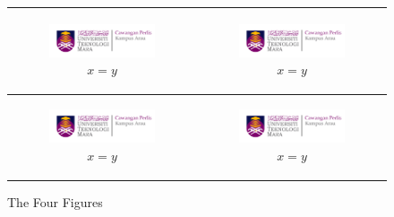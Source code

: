 \begin{figure}[ht]
    \centering
	\begin{tabular}{|c|c|}
		\hline
		\begin{subfigure}[b]{0.44\textwidth}
			\centering
			\includegraphics[width=.8\linewidth]{mainmatter/images/logouitm.png}
			\caption{$x=y$}
         	\label{fig:x_equals_y4}
		\end{subfigure} & 
				\begin{subfigure}[b]{0.44\textwidth}
			\centering
			\includegraphics[width=.8\linewidth]{mainmatter/images/logouitm.png}
			\caption{$x=y$}
         	\label{fig:xy_equals_y3}
		\end{subfigure}	\\
		\hline
		\begin{subfigure}[b]{0.44\textwidth}
			\centering
			\includegraphics[width=.8\linewidth]{mainmatter/images/logouitm.png}
			\caption{$x=y$}
         	\label{fig:yy1}
		\end{subfigure} & 
				\begin{subfigure}[b]{0.44\textwidth}
			\centering
			\includegraphics[width=.8\linewidth]{mainmatter/images/logouitm.png}
			\caption{$x=y$}
         	\label{fig:xy2}
		\end{subfigure}	\\
		\hline		
	\end{tabular}
    \caption{The Four Figures}
    \label{fig:the4fig}
\end{figure}


